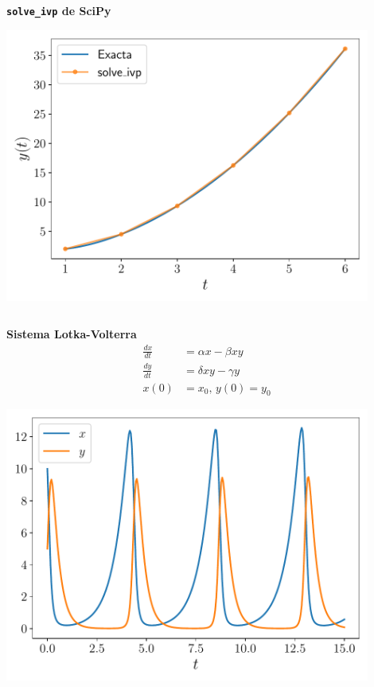 \documentclass[9pt, aspectratio=169]{beamer}
\begin{document}
\begin{frame}[fragile]
\begin{columns}

\begin{center}
    \textbf{\texttt{solve\_ivp} de SciPy}

    \includegraphics[width=0.9\textwidth]{code/solve_ivp.pdf}
\end{center}
\end{columns}
\end{frame}

\begin{frame}[fragile]
\begin{columns}

\begin{center}
    \textbf{Sistema Lotka-Volterra}
    \begin{align*}
        \frac{dx}{dt} &= \alpha x - \beta x y \\
        \frac{dy}{dt} &= \delta x y - \gamma y \\
        x(0) &= x_0, \, y(0) = y_0
    \end{align*}

    \includegraphics[width=0.9\textwidth]{code/lv.pdf}
\end{center}
\end{columns}
\end{frame}
\end{document}
